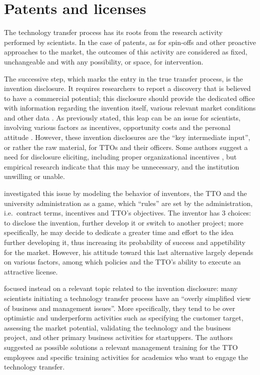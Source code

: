 \section{Patents and licenses}

The technology transfer process has its roots from the research activity performed by scientists. In the case of patents, as for spin-offs and other proactive approaches to the market, the outcomes of this activity are considered as fixed, unchangeable and with any possibility, or space, for intervention. 

The successive step, which marks the entry in the true transfer process, is the invention disclosure. It requires researchers to report a discovery that is believed to have a commercial potential; this disclosure should provide the dedicated office with information regarding the invention itself, various relevant market conditions and other data \citep{Thursby2002}. As previously stated, this leap can be an issue for scientists, involving various factors as incentives, opportunity costs and the personal attitude \citep{OwenSmith2001}. However, these invention disclosures are the \enquote{key intermediate input}, or rather the raw material, for TTOs and their officers. Some authors suggest a need for disclosure eliciting, including proper organizational incentives \citep{Siegel2003a}, but empirical research indicate that this may be unnecessary, and the institution unwilling or unable. 

\citet{Jensen2003} investigated this issue by modeling the behavior of inventors, the TTO and the university administration as a game, which \enquote{rules} are set by the administration, i.e.\ contract terms, incentives and TTO's objectives. The inventor has 3 choices: to disclose the invention, further develop it or switch to another project; more specifically, he may decide to dedicate a greater time and effort to the idea further developing it, thus increasing its probability of success and appetibility for the market. However, his attitude toward this last alternative largely depends on various factors, among which policies and the TTO's ability to execute an attractive license.

\citet{McAdam2005} focused instead on a relevant topic related to the invention disclosure: many scientists initiating a technology transfer process have an \enquote{overly simplified view of business and management issues}. More specifically, they tend to be over optimistic and underperform activities such as specifying the customer target, assessing the market potential, validating the technology and the business project, and other primary business activities for startuppers. The authors suggested as possible solutions a relevant management training for the TTO employees and specific training activities for academics who want to engage the technology transfer.

